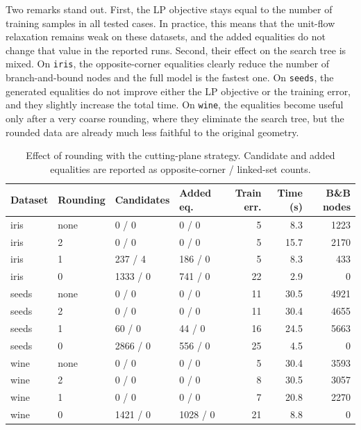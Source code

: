 \documentclass[11pt,a4paper]{article}
\begin{document}
Two remarks stand out. First, the LP objective stays equal to the number of training samples in all tested cases. In practice, this means that the unit-flow relaxation remains weak on these datasets, and the added equalities do not change that value in the reported runs. Second, their effect on the search tree is mixed. On \texttt{iris}, the opposite-corner equalities clearly reduce the number of branch-and-bound nodes and the full model is the fastest one. On \texttt{seeds}, the generated equalities do not improve either the LP objective or the training error, and they slightly increase the total time. On \texttt{wine}, the equalities become useful only after a very coarse rounding, where they eliminate the search tree, but the rounded data are already much less faithful to the original geometry.

\begin{table}[H]
\centering
\footnotesize
\begin{tabularx}{\textwidth}{llYYrrr}
\toprule
Dataset & Rounding & Candidates & Added eq. & Train err. & Time (s) & B\&B nodes \\
\midrule
iris & none & 0 / 0 & 0 / 0 & 5 & 8.3 & 1223 \\
iris & 2 & 0 / 0 & 0 / 0 & 5 & 15.7 & 2170 \\
iris & 1 & 237 / 4 & 186 / 0 & 5 & 8.3 & 433 \\
iris & 0 & 1333 / 0 & 741 / 0 & 22 & 2.9 & 0 \\
\midrule
seeds & none & 0 / 0 & 0 / 0 & 11 & 30.5 & 4921 \\
seeds & 2 & 0 / 0 & 0 / 0 & 11 & 30.4 & 4655 \\
seeds & 1 & 60 / 0 & 44 / 0 & 16 & 24.5 & 5663 \\
seeds & 0 & 2866 / 0 & 556 / 0 & 25 & 4.5 & 0 \\
\midrule
wine & none & 0 / 0 & 0 / 0 & 5 & 30.4 & 3593 \\
wine & 2 & 0 / 0 & 0 / 0 & 8 & 30.5 & 3057 \\
wine & 1 & 0 / 0 & 0 / 0 & 7 & 20.8 & 2270 \\
wine & 0 & 1421 / 0 & 1028 / 0 & 21 & 8.8 & 0 \\
\bottomrule
\end{tabularx}
\caption{Effect of rounding with the cutting-plane strategy. Candidate and added equalities are reported as opposite-corner / linked-set counts.}
\label{tab:q4-rounding}
\end{table}
\end{document}

